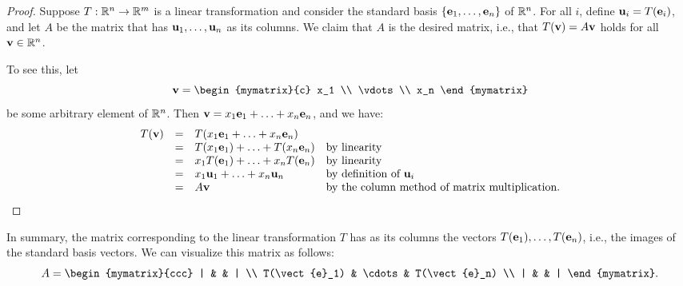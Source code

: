 \begin{proof}
  Suppose $T:\mathbb{R}^n\to \mathbb{R}^m$ is a linear transformation and consider
  the standard basis $\set{\vect{e}_1,\ldots,\vect{e}_n}$ of $\mathbb{R}^n$.
  For all $i$, define $\vect{u}_i = T(\vect{e}_i)$, and let $A$ be the
  matrix that has $\vect{u}_1,\ldots,\vect{u}_n$ as its columns. We
  claim that $A$ is the desired matrix, i.e., that
  $T(\vect{v}) = A\vect{v}$ holds for all $\vect{v}\in\R^n$.

  To see this, let
  \begin{equation*}
    \vect{v} =
    \begin{mymatrix}{c} x_1 \\ \vdots \\ x_n \end{mymatrix}
  \end{equation*}
  be some arbitrary element of $\mathbb{R}^n$. Then
  $\vect{v} = x_1\vect{e}_1 + \ldots + x_n\vect{e}_n$, and we have:
  \begin{equation*}
    \begin{array}{rcl@{\quad}l}
      T(\vect{v})
      &=& T(x_1\vect{e}_1 + \ldots + x_n\vect{e}_n)
      \\
      &=& T(x_1\vect{e}_1) + \ldots + T(x_n\vect{e}_n)
      & \mbox{by linearity}\\
      &=& x_1T(\vect{e}_1) + \ldots + x_nT(\vect{e}_n)
      & \mbox{by linearity}\\
      &=& x_1\vect{u}_1 + \ldots + x_n\vect{u}_n
      & \mbox{by definition of $\vect{u}_i$}\\
      &=& A\vect{v}
      & \mbox{by the column method of matrix multiplication.}
    \end{array}
  \end{equation*}
\end{proof}

In summary, the matrix corresponding to the linear transformation $T$
has as its columns the vectors $T(\vect{e}_1),\ldots,T(\vect{e}_n)$,
i.e., the images of the standard basis vectors. We can visualize this
matrix as follows:
\begin{equation*}
  A=
  \begin{mymatrix}{ccc}
    | &  & | \\
    T(\vect{e}_1) & \cdots & T(\vect{e}_n) \\
    | &  & |
  \end{mymatrix}.
\end{equation*}

